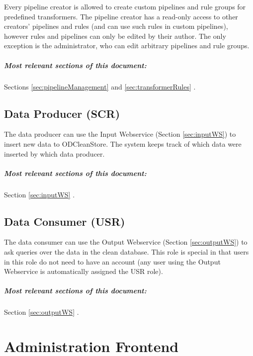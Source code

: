 	Every pipeline creator is allowed to create custom pipelines and rule groups for predefined transformers. The pipeline creator has a read-only access to other creators' pipelines and rules (and can use such rules in custom pipelines), however rules and pipelines can only be edited by their author. The only exception is the administrator, who can edit arbitrary pipelines and rule groups.

	\paragraph{Most relevant sections of this document:} Sections \ref{sec:pipelineManagement}  and \ref{sec:transformerRules} .
	
\section[Data Producer]{Data Producer (SCR)} 
  The data producer can use the Input Webservice (Section \ref{sec:inputWS}) to insert new data to ODCleanStore. The system keeps track of which data were inserted by which data producer.

  \paragraph{Most relevant sections of this document:} Section \ref{sec:inputWS} .

\section[Data Consumer]{Data Consumer (USR)} 
  The data consumer can use the Output Webservice (Section \ref{sec:outputWS}) to ask queries over the data in the clean database. This role is special in that users in this role do not need to have an account (any user using the Output Webservice is automatically assigned the USR role).

  \paragraph{Most relevant sections of this document:} Section \ref{sec:outputWS} .


\chapter{Administration Frontend}
\label{chap:administrationFrontend}

